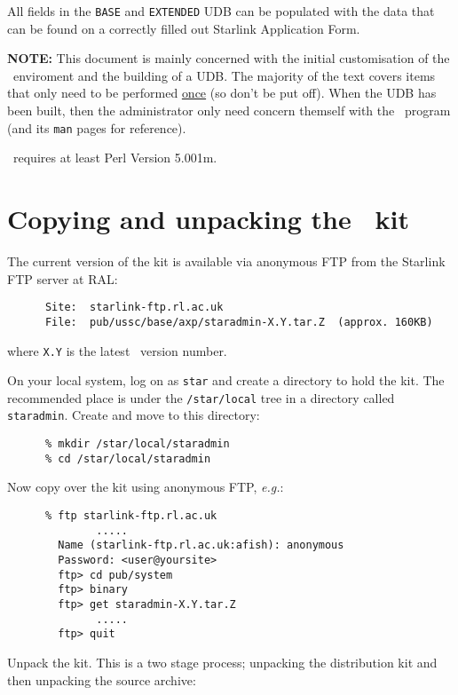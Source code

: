All fields in the {\tt BASE} and {\tt EXTENDED} UDB can be populated with
the data that can be found on a correctly filled out Starlink Application
Form. 

{\large\bf NOTE:} This document is mainly concerned with the initial
customisation of the \staradmin\ enviroment and the building of a UDB. The
majority of the text covers items that only need to be performed
\underline{once} (so don't be put off). When the UDB has been built, then
the administrator only need concern themself with the \staradmin\ program
(and its {\tt man} pages for reference). 

\staradmin\ requires at least Perl Version 5.001m. 


\section{Copying and unpacking the \staradmin\ kit}
\label{sec:unpack}

The current version of the kit is available via anonymous FTP from the Starlink
FTP server at RAL:

\begin{verbatim}
      Site:  starlink-ftp.rl.ac.uk   
      File:  pub/ussc/base/axp/staradmin-X.Y.tar.Z  (approx. 160KB)
\end{verbatim}

where {\tt X.Y} is the latest \staradmin\ version number. 

On your local system, log on as {\tt star} and create a directory to hold
the kit.  The recommended place is under the {\tt /star/local} tree in a
directory called {\tt staradmin}.  Create and move to this directory: 

\begin{verbatim}
      % mkdir /star/local/staradmin
      % cd /star/local/staradmin
\end{verbatim}

Now copy over the kit using anonymous FTP, {\em e.g.}:

\begin{verbatim}
      % ftp starlink-ftp.rl.ac.uk
              .....
        Name (starlink-ftp.rl.ac.uk:afish): anonymous
        Password: <user@yoursite>
        ftp> cd pub/system
        ftp> binary
        ftp> get staradmin-X.Y.tar.Z
              .....
        ftp> quit
\end{verbatim}

Unpack the kit.  This is a two stage process; unpacking the distribution
kit and then unpacking the source archive:

